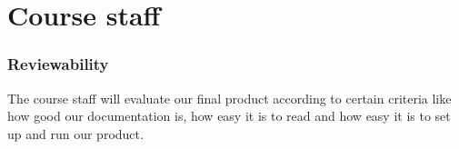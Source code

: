     \section{Course staff}
        \subsubsection*{Reviewability}
        The course staff will evaluate our final product according to certain criteria like how good our documentation is, how easy it is to read and how easy it is to set up and run our product.
